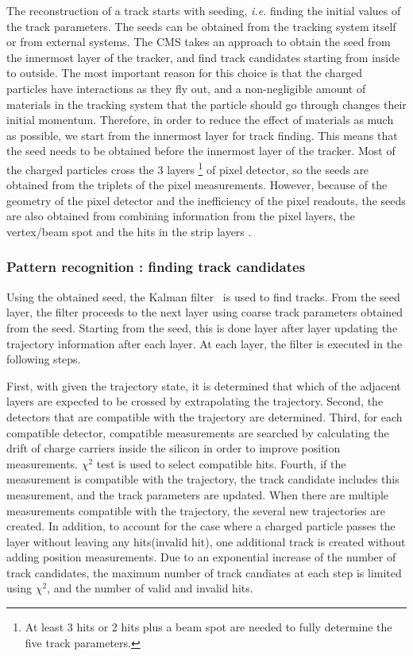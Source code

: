 The reconstruction of a track starts with seeding, \textit{i.e.} 
finding the initial values of the track parameters. 
The seeds can be obtained from the tracking system itself or from external systems.  
The CMS takes an approach to obtain the seed from the innermost layer 
of the tracker, and find track candidates starting from inside to outside. 
The most important reason for this choice is that the 
charged particles have interactions as they fly out,
and a non-negligible amount of materials in the tracking system 
that the particle should go through changes their initial momentum.
Therefore, in order to reduce the effect of materials as much as possible, 
we start from the innermost layer for track finding. 
This means that the seed needs to be obtained before the innermost 
layer of the tracker. Most of the charged particles cross the 3 layers 
\footnote{At least 3 hits or 2 hits plus a beam spot are needed to 
fully determine the five track parameters.}
of pixel detector, so the seeds are obtained from the triplets of the 
pixel measurements. 
However, because of the geometry of the pixel detector 
and the inefficiency of the pixel readouts, 
the seeds are also obtained from combining information from the pixel layers, 
the vertex/beam spot and the hits in the strip layers \cite{cmstdr1}.   

\subsubsection{Pattern recognition : finding track candidates}

Using the obtained seed, the Kalman filter~\cite{Fruhwirth1996189} 
is used to find tracks. 
From the seed layer, the filter proceeds to the next layer using coarse 
track parameters obtained from the seed. Starting from the seed, this is done 
layer after layer updating the trajectory information after each layer. 
At each layer, the filter is executed in the following steps. 

First, with given the trajectory state, 
it is determined that which of the adjacent layers are expected 
to be crossed by extrapolating the trajectory. Second, the detectors 
that are compatible with the trajectory are determined. Third, 
for each compatible detector, compatible measurements are searched 
by calculating the drift of charge carriers inside the silicon 
in order to improve position measurements. $\chi^2$ test is used 
to select compatible hits. Fourth, if the measurement is compatible 
with the trajectory, the track candidate includes this measurement, 
and the track parameters are updated. When there are multiple measurements
compatible with the trajectory, the several new trajectories are 
created. In addition, to account for the case where a charged particle 
passes the layer without leaving any hits(invalid hit), 
one additional track is created without adding position measurements.  
Due to an exponential increase of the number of track candidates, 
the maximum number of track candiates at each step is limited 
using $\chi^2$, and the number of valid and invalid hits. 

